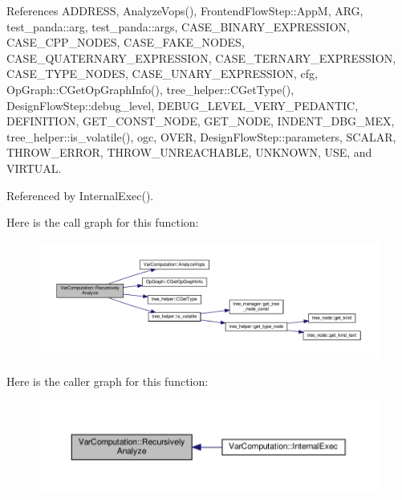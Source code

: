 References A\+D\+D\+R\+E\+SS, Analyze\+Vops(), Frontend\+Flow\+Step\+::\+AppM, A\+RG, test\+\_\+panda\+::arg, test\+\_\+panda\+::args, C\+A\+S\+E\+\_\+\+B\+I\+N\+A\+R\+Y\+\_\+\+E\+X\+P\+R\+E\+S\+S\+I\+ON, C\+A\+S\+E\+\_\+\+C\+P\+P\+\_\+\+N\+O\+D\+ES, C\+A\+S\+E\+\_\+\+F\+A\+K\+E\+\_\+\+N\+O\+D\+ES, C\+A\+S\+E\+\_\+\+Q\+U\+A\+T\+E\+R\+N\+A\+R\+Y\+\_\+\+E\+X\+P\+R\+E\+S\+S\+I\+ON, C\+A\+S\+E\+\_\+\+T\+E\+R\+N\+A\+R\+Y\+\_\+\+E\+X\+P\+R\+E\+S\+S\+I\+ON, C\+A\+S\+E\+\_\+\+T\+Y\+P\+E\+\_\+\+N\+O\+D\+ES, C\+A\+S\+E\+\_\+\+U\+N\+A\+R\+Y\+\_\+\+E\+X\+P\+R\+E\+S\+S\+I\+ON, cfg, Op\+Graph\+::\+C\+Get\+Op\+Graph\+Info(), tree\+\_\+helper\+::\+C\+Get\+Type(), Design\+Flow\+Step\+::debug\+\_\+level, D\+E\+B\+U\+G\+\_\+\+L\+E\+V\+E\+L\+\_\+\+V\+E\+R\+Y\+\_\+\+P\+E\+D\+A\+N\+T\+IC, D\+E\+F\+I\+N\+I\+T\+I\+ON, G\+E\+T\+\_\+\+C\+O\+N\+S\+T\+\_\+\+N\+O\+DE, G\+E\+T\+\_\+\+N\+O\+DE, I\+N\+D\+E\+N\+T\+\_\+\+D\+B\+G\+\_\+\+M\+EX, tree\+\_\+helper\+::is\+\_\+volatile(), ogc, O\+V\+ER, Design\+Flow\+Step\+::parameters, S\+C\+A\+L\+AR, T\+H\+R\+O\+W\+\_\+\+E\+R\+R\+OR, T\+H\+R\+O\+W\+\_\+\+U\+N\+R\+E\+A\+C\+H\+A\+B\+LE, U\+N\+K\+N\+O\+WN, U\+SE, and V\+I\+R\+T\+U\+AL.



Referenced by Internal\+Exec().

Here is the call graph for this function\+:
\nopagebreak
\begin{figure}[H]
\begin{center}
\leavevmode
\includegraphics[width=350pt]{dd/d82/classVarComputation_adbf3ccb08fa07a97200ab564774c9518_cgraph}
\end{center}
\end{figure}
Here is the caller graph for this function\+:
\nopagebreak
\begin{figure}[H]
\begin{center}
\leavevmode
\includegraphics[width=350pt]{dd/d82/classVarComputation_adbf3ccb08fa07a97200ab564774c9518_icgraph}
\end{center}
\end{figure}


